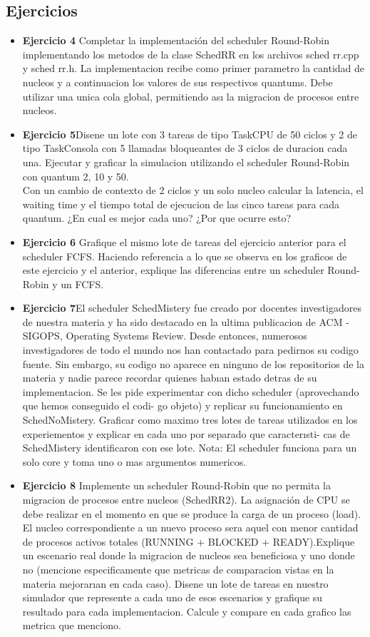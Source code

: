 
\subsection{Ejercicios}
\begin{itemize}
 \item 
\textbf{Ejercicio 4}  Completar la implementación del scheduler Round-Robin implementando los
metodos de la clase SchedRR en los archivos sched rr.cpp y sched rr.h. La implementacion
recibe como primer parametro la cantidad de nucleos y a continuacion los valores de sus
respectivos quantums. Debe utilizar una unica cola global, permitiendo ası la migracion de
procesos entre nucleos.
\item \textbf{Ejercicio 5}Disene un lote con 3 tareas de tipo TaskCPU de 50 ciclos y 2 de tipo TaskConsola
con 5 llamadas bloqueantes de 3 ciclos de duracion cada una. Ejecutar y graficar la simulacion
utilizando el scheduler Round-Robin con quantum 2, 10 y 50.\\
Con un cambio de contexto de 2 ciclos y un solo nucleo calcular la latencia, el waiting
time y el tiempo total de ejecucion de las cinco tareas para cada quantum. 
¿En cual es mejor cada uno? ¿Por que ocurre esto?
\item \textbf{Ejercicio 6} Grafique el mismo lote de tareas del ejercicio anterior para el scheduler FCFS.
Haciendo referencia a lo que se observa en los graficos de este ejercicio y el anterior, explique
las diferencias entre un scheduler Round-Robin y un FCFS.
\item \textbf{Ejercicio 7}El scheduler SchedMistery fue creado por docentes investigadores de nuestra
materia y ha sido destacado en la ultima publicacion de ACM - SIGOPS, Operating Systems
Review. Desde entonces, numerosos investigadores de todo el mundo nos han contactado para
pedirnos su codigo fuente. Sin embargo, su codigo no aparece en ninguno de los repositorios
de la materia y nadie parece recordar quienes habıan estado detras de su implementacion.
Se les pide experimentar con dicho scheduler (aprovechando que hemos conseguido el codi-
go objeto) y replicar su funcionamiento en SchedNoMistery. Graficar como maximo tres lotes
de tareas utilizados en los experiementos y explicar en cada uno por separado que caracterısti-
cas de SchedMistery identificaron con ese lote. Nota: El scheduler funciona para un solo
core y toma uno o mas argumentos numericos.
\item \textbf{Ejercicio 8} Implemente un scheduler Round-Robin que no permita la migracion de procesos
entre nucleos (SchedRR2). La asignación de CPU se debe realizar en el momento en que se produce la carga 
de un proceso (load). El nucleo correspondiente a un nuevo proceso sera aquel
con menor cantidad de procesos activos totales (RUNNING + BLOCKED + READY).Explique un escenario real 
donde la migracion de nucleos sea beneficiosa y uno donde no (mencione
especificamente que metricas de comparacion vistas en la materia mejorarıan en cada caso).
Disene un lote de tareas en nuestro simulador que represente a cada uno de esos escenarios
y grafique su resultado para cada implementacion. Calcule y compare en cada grafico las
metrica que menciono.

\end{itemize}


